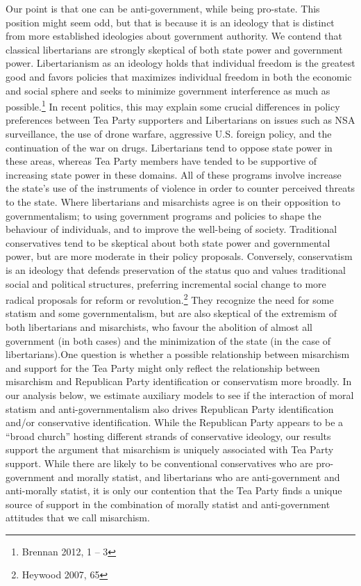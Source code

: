 \documentclass[12pt,]{article}
\begin{document}
Our point is that one can be anti-government, while being pro-state.
This position might seem odd, but that is because it is an ideology that
is distinct from more established ideologies about government authority.
We contend that classical libertarians are strongly skeptical of both
state power and government power. Libertarianism as an ideology holds
that individual freedom is the greatest good and favors policies that
maximizes individual freedom in both the economic and social sphere and
seeks to minimize government interference as much as possible.\footnote{Brennan
  2012, 1 -- 3} In recent politics, this may explain some crucial
differences in policy preferences between Tea Party supporters and
Libertarians on issues such as NSA surveillance, the use of drone
warfare, aggressive U.S. foreign policy, and the continuation of the war
on drugs. Libertarians tend to oppose state power in these areas,
whereas Tea Party members have tended to be supportive of increasing
state power in these domains. All of these programs involve increase the
state's use of the instruments of violence in order to counter perceived
threats to the state. Where libertarians and misarchists agree is on
their opposition to governmentalism; to using government programs and
policies to shape the behaviour of individuals, and to improve the
well-being of society. Traditional conservatives tend to be skeptical
about both state power and governmental power, but are more moderate in
their policy proposals. Conversely, conservatism is an ideology that
defends preservation of the status quo and values traditional social and
political structures, preferring incremental social change to more
radical proposals for reform or revolution.\footnote{Heywood 2007, 65}
They recognize the need for some statism and some governmentalism, but
are also skeptical of the extremism of both libertarians and
misarchists, who favour the abolition of almost all government (in both
cases) and the minimization of the state (in the case of
libertarians).One question is whether a possible relationship between
misarchism and support for the Tea Party might only reflect the
relationship between misarchism and Republican Party identification or
conservatism more broadly. In our analysis below, we estimate auxiliary
models to see if the interaction of moral statism and
anti-governmentalism also drives Republican Party identification and/or
conservative identification. While the Republican Party appears to be a
``broad church'' hosting different strands of conservative ideology, our
results support the argument that misarchism is uniquely associated with
Tea Party support. While there are likely to be conventional
conservatives who are pro-government and morally statist, and
libertarians who are anti-government and anti-morally statist, it is
only our contention that the Tea Party finds a unique source of support
in the combination of morally statist and anti-government attitudes that
we call misarchism.
\end{document}
